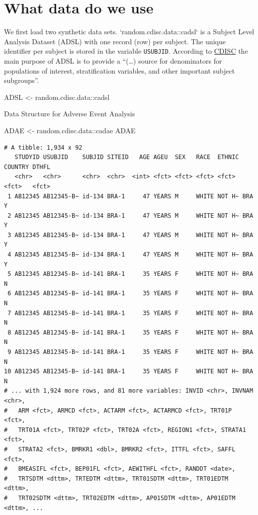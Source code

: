 \documentclass[
  letterpaper,
  DIV=11,
  numbers=noendperiod]{scrreprt}
\newenvironment{Shaded}{\begin{snugshade}}{\end{snugshade}}
\newcommand{\NormalTok}[1]{\textcolor[rgb]{0.00,0.23,0.31}{#1}}
\newcommand{\OtherTok}[1]{\textcolor[rgb]{0.00,0.23,0.31}{#1}}
\newcommand{\SpecialCharTok}[1]{\textcolor[rgb]{0.37,0.37,0.37}{#1}}
\begin{document}
\hypertarget{what-data-do-we-use}{%
\section{What data do we use}\label{what-data-do-we-use}}

We first load two synthetic data sets. `random.cdisc.data::cadsl` is a
Subject Level Analysis Dataset (ADSL) with one record (row) per subject.
The unique identifier per subject is stored in the variable
\texttt{USUBJID}. According to
\href{https://www.cdisc.org/education/course/subject-level-analysis-dataset-adsl}{CDISC}
the main purpose of ADSL is to provide a ``(\ldots) source for
denominators for populations of interest, stratification variables, and
other important subject subgroups''.

\begin{Shaded}
\begin{Highlighting}[]
\NormalTok{ADSL }\OtherTok{\textless{}{-}}\NormalTok{ random.cdisc.data}\SpecialCharTok{::}\NormalTok{cadsl}
\end{Highlighting}
\end{Shaded}

Data Structure for Adverse Event Analysis

\begin{Shaded}
\begin{Highlighting}[]
\NormalTok{ADAE }\OtherTok{\textless{}{-}}\NormalTok{ random.cdisc.data}\SpecialCharTok{::}\NormalTok{cadae}
\NormalTok{ADAE}
\end{Highlighting}
\end{Shaded}

\begin{verbatim}
# A tibble: 1,934 x 92
   STUDYID USUBJID    SUBJID SITEID   AGE AGEU  SEX   RACE  ETHNIC COUNTRY DTHFL
   <chr>   <chr>      <chr>  <chr>  <int> <fct> <fct> <fct> <fct>  <fct>   <fct>
 1 AB12345 AB12345-B~ id-134 BRA-1     47 YEARS M     WHITE NOT H~ BRA     Y    
 2 AB12345 AB12345-B~ id-134 BRA-1     47 YEARS M     WHITE NOT H~ BRA     Y    
 3 AB12345 AB12345-B~ id-134 BRA-1     47 YEARS M     WHITE NOT H~ BRA     Y    
 4 AB12345 AB12345-B~ id-134 BRA-1     47 YEARS M     WHITE NOT H~ BRA     Y    
 5 AB12345 AB12345-B~ id-141 BRA-1     35 YEARS F     WHITE NOT H~ BRA     N    
 6 AB12345 AB12345-B~ id-141 BRA-1     35 YEARS F     WHITE NOT H~ BRA     N    
 7 AB12345 AB12345-B~ id-141 BRA-1     35 YEARS F     WHITE NOT H~ BRA     N    
 8 AB12345 AB12345-B~ id-141 BRA-1     35 YEARS F     WHITE NOT H~ BRA     N    
 9 AB12345 AB12345-B~ id-141 BRA-1     35 YEARS F     WHITE NOT H~ BRA     N    
10 AB12345 AB12345-B~ id-141 BRA-1     35 YEARS F     WHITE NOT H~ BRA     N    
# ... with 1,924 more rows, and 81 more variables: INVID <chr>, INVNAM <chr>,
#   ARM <fct>, ARMCD <fct>, ACTARM <fct>, ACTARMCD <fct>, TRT01P <fct>,
#   TRT01A <fct>, TRT02P <fct>, TRT02A <fct>, REGION1 <fct>, STRATA1 <fct>,
#   STRATA2 <fct>, BMRKR1 <dbl>, BMRKR2 <fct>, ITTFL <fct>, SAFFL <fct>,
#   BMEASIFL <fct>, BEP01FL <fct>, AEWITHFL <fct>, RANDDT <date>,
#   TRTSDTM <dttm>, TRTEDTM <dttm>, TRT01SDTM <dttm>, TRT01EDTM <dttm>,
#   TRT02SDTM <dttm>, TRT02EDTM <dttm>, AP01SDTM <dttm>, AP01EDTM <dttm>, ...
\end{verbatim}
\end{document}
